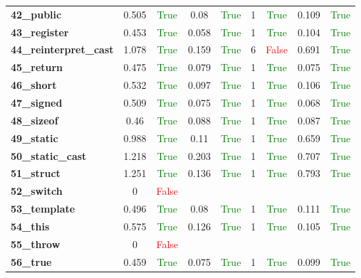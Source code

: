 \documentclass{article}
\begin{document}
\begin{xltabular}{\textwidth}{lcccccccc}
\textbf{42\_public}& 0.505&\textcolor{green}{True}& 0.08&\textcolor{green}{True}& 1&\textcolor{green}{True}& 0.109&\textcolor{green}{True} \\[0.5ex]
\textbf{43\_register}& 0.453&\textcolor{green}{True}& 0.058&\textcolor{green}{True}& 1&\textcolor{green}{True}& 0.104&\textcolor{green}{True} \\[0.5ex]
\textbf{44\_reinterpret\_cast}& 1.078&\textcolor{green}{True}& 0.159&\textcolor{green}{True}& 6&\textcolor{red}{False}& 0.691&\textcolor{green}{True} \\[0.5ex]
\textbf{45\_return}& 0.475&\textcolor{green}{True}& 0.079&\textcolor{green}{True}& 1&\textcolor{green}{True}& 0.075&\textcolor{green}{True} \\[0.5ex]
\textbf{46\_short}& 0.532&\textcolor{green}{True}& 0.097&\textcolor{green}{True}& 1&\textcolor{green}{True}& 0.106&\textcolor{green}{True} \\[0.5ex]
\textbf{47\_signed}& 0.509&\textcolor{green}{True}& 0.075&\textcolor{green}{True}& 1&\textcolor{green}{True}& 0.068&\textcolor{green}{True} \\[0.5ex]
\textbf{48\_sizeof}& 0.46&\textcolor{green}{True}& 0.088&\textcolor{green}{True}& 1&\textcolor{green}{True}& 0.087&\textcolor{green}{True} \\[0.5ex]
\textbf{49\_static}& 0.988&\textcolor{green}{True}& 0.11&\textcolor{green}{True}& 1&\textcolor{green}{True}& 0.659&\textcolor{green}{True} \\[0.5ex]
\textbf{50\_static\_cast}& 1.218&\textcolor{green}{True}& 0.203&\textcolor{green}{True}& 1&\textcolor{green}{True}& 0.707&\textcolor{green}{True} \\[0.5ex]
\textbf{51\_struct}& 1.251&\textcolor{green}{True}& 0.136&\textcolor{green}{True}& 1&\textcolor{green}{True}& 0.793&\textcolor{green}{True} \\[0.5ex]
\textbf{52\_switch}& 0&\textcolor{red}{False} \\[0.5ex]
\textbf{53\_template}& 0.496&\textcolor{green}{True}& 0.08&\textcolor{green}{True}& 1&\textcolor{green}{True}& 0.111&\textcolor{green}{True} \\[0.5ex]
\textbf{54\_this}& 0.575&\textcolor{green}{True}& 0.126&\textcolor{green}{True}& 1&\textcolor{green}{True}& 0.105&\textcolor{green}{True} \\[0.5ex]
\textbf{55\_throw}& 0&\textcolor{red}{False} \\[0.5ex]
\textbf{56\_true}& 0.459&\textcolor{green}{True}& 0.075&\textcolor{green}{True}& 1&\textcolor{green}{True}& 0.099&\textcolor{green}{True} \\[0.5ex]

\end{xltabular}
\end{document}
